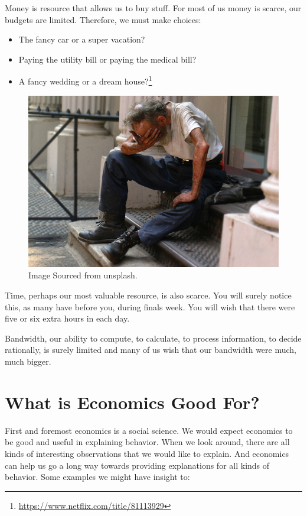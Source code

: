 \documentclass[
]{book}
\providecommand{\tightlist}{%
  \setlength{\itemsep}{0pt}\setlength{\parskip}{0pt}}
\begin{document}
Money is resource that allows us to buy stuff. For most of us money is scarce, our budgets are limited. Therefore, we must make choices:

\begin{itemize}
\tightlist
\item
  The fancy car or a super vacation?
\item
  Paying the utility bill or paying the medical bill?
\item
  A fancy wedding or a dream house?\footnote{\url{https://www.netflix.com/title/81113929}}
\end{itemize}

\begin{figure}

{\centering \includegraphics[width=0.5\linewidth]{img/intro/fig7} 

}

\caption{Image Sourced from unsplash.}\label{fig:intro07}
\end{figure}

Time, perhaps our most valuable resource, is also scarce. You will surely notice this, as many have before you, during finals week. You will wish that there were five or six extra hours in each day.

Bandwidth, our ability to compute, to calculate, to process information, to decide rationally, is surely limited and many of us wish that our bandwidth were much, much bigger.

\hypertarget{what-is-economics-good-for}{%
\section{What is Economics Good For?}\label{what-is-economics-good-for}}

First and foremost economics is a social science. We would expect economics to be good and useful in explaining behavior. When we look around, there are all kinds of interesting observations that we would like to explain. And economics can help us go a long way towards providing explanations for all kinds of behavior. Some examples we might have insight to:
\end{document}
